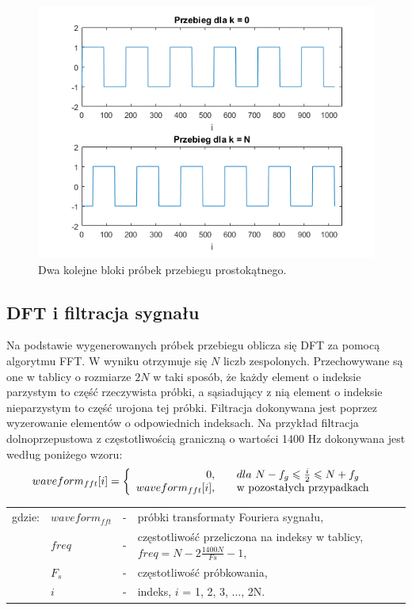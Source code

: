 \begin{figure}[H]
	\centering
	\includegraphics[width=12cm]{grafiki/sub_waveform_blocks}
	\captionsetup{justification=centering}
	\caption{Dwa kolejne bloki próbek przebiegu prostokątnego.}
	\label{rys:sub_waveform_blocks}
\end{figure}

\subsection{DFT i filtracja sygnału}
Na podstawie wygenerowanych próbek przebiegu oblicza się DFT za pomocą algorytmu FFT. W wyniku otrzymuje się $N$ liczb zespolonych. Przechowywane są one w tablicy o rozmiarze $2N$ w taki sposób, że każdy element o indeksie parzystym to część rzeczywista próbki, a sąsiadujący z nią element o indeksie nieparzystym to część urojona tej próbki. Filtracja dokonywana jest poprzez wyzerowanie elementów o odpowiednich indeksach. Na przykład filtracja dolnoprzepustowa z częstotliwością graniczną o wartości 1400 Hz dokonywana jest według poniżego wzoru:
\begin{equation} \label{equ:sub_3}
waveform_{fft}[i]=\left \{\begin{array}{ r l }
0, & \quad  \text{$dla$ } N - f_g \leqslant \frac{i}{2} \leqslant N + f_g \\
waveform_{fft}[i], & \quad \text{w pozostałych przypadkach } 

\end{array}
\right.
\end{equation}
\begin{tabular}{ l l l l}
	gdzie: & $waveform_{fft}$ &  - & próbki transformaty Fouriera sygnału, \\
	&	$freq$ & - &  częstotliwość przeliczona na indeksy w tablicy, $freq = N - 2 \frac{1400N}{Fs} - 1$, \\
	&	$F_s$ & - & częstotliwość próbkowania,\\
	&	$i$ & - &  indeks, $i$ = 1, 2, 3, ..., 2N.\\
\end{tabular} \\ \\

